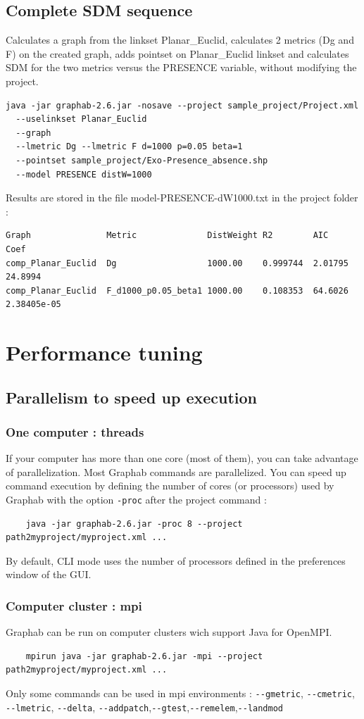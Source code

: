 \documentclass[a4paper,10pt]{report}
\begin{document}
\section{Complete SDM sequence}
Calculates a graph from the linkset Planar\_Euclid, calculates 2 metrics (Dg and F) on the created graph, adds pointset on Planar\_Euclid linkset 
and calculates SDM for the two metrics versus the PRESENCE variable, without modifying the project.
\begin{Verbatim}
java -jar graphab-2.6.jar -nosave --project sample_project/Project.xml  
  --uselinkset Planar_Euclid 
  --graph 
  --lmetric Dg --lmetric F d=1000 p=0.05 beta=1 
  --pointset sample_project/Exo-Presence_absence.shp 
  --model PRESENCE distW=1000
\end{Verbatim}
Results are stored in the file model-PRESENCE-dW1000.txt in the project folder :
\begin{Verbatim}
Graph               Metric              DistWeight R2        AIC      Coef
comp_Planar_Euclid  Dg                  1000.00    0.999744  2.01795  24.8994
comp_Planar_Euclid  F_d1000_p0.05_beta1 1000.00    0.108353  64.6026  2.38405e-05
\end{Verbatim}

\chapter{Performance tuning}
\section{Parallelism to speed up execution}
\subsection{One computer : threads}
If your computer has more than one core (most of them), you can take advantage of parallelization. 
Most Graphab commands are parallelized. You can speed up command execution by defining the number
of cores (or processors) used by Graphab with the option \verb|-proc| after the project command :
\begin{Verbatim}
	java -jar graphab-2.6.jar -proc 8 --project path2myproject/myproject.xml ...
\end{Verbatim}
By default, CLI mode uses the number of processors defined in the preferences window of the GUI.
\subsection{Computer cluster : mpi}
Graphab can be run on computer clusters wich support Java for OpenMPI.
\begin{Verbatim}
	mpirun java -jar graphab-2.6.jar -mpi --project path2myproject/myproject.xml ...
\end{Verbatim}
Only some commands can be used in mpi environments : \verb|--gmetric|, \verb|--cmetric|, \verb|--lmetric|, \verb|--delta|, \verb|--addpatch|,\verb|--gtest|,\verb|--remelem|,\verb|--landmod|
\end{document}
